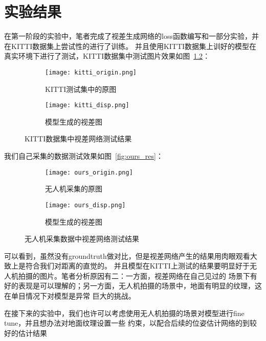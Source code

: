 \chapter{实验结果}
\label{cha:china}

在第一阶段的实验中，笔者完成了视差生成网络的loss函数编写和一部分实验，并在KITTI数据集上尝试性的进行了训练。
并且使用KITTI数据集上训好的模型在真实环境下进行了测试，KITTI数据集中测试图片效果如图~\ref{fig:kitti_res}：

\begin{figure}
\begin{subfigure}{1.\textwidth}
  \centering
  \texttt{[image: kitti\_origin.png]}
  \caption{KITTI测试集中的原图}
\end{subfigure}%

\begin{subfigure}{1.\textwidth}
  \centering
  \texttt{[image: kitti\_disp.png]}
  \caption{模型生成的视差图}
\end{subfigure}
\caption{KITTI数据集中视差网络测试结果}
\label{fig:kitti_res}
\end{figure}

我们自己采集的数据测试效果如图~\ref{fig:ours_res}：


\begin{figure}
\begin{subfigure}{.5\textwidth}
  \centering
  \texttt{[image: ours\_origin.png]}
  \caption{无人机采集的原图}
\end{subfigure}%
\begin{subfigure}{.5\textwidth}
  \centering
  \texttt{[image: ours\_disp.png]}
  \caption{模型生成的视差图}
\end{subfigure}
\caption{ 无人机采集数据中视差网络测试结果}
\label{fig:kitti_res}
\end{figure}

可以看到，虽然没有groundtruth做对比，但是视差网络产生的结果用肉眼观看大致上是符合我们对距离的直觉的。
并且模型在KITTI上测试的结果要明显好于无人机拍摄的图片。笔者分析原因有二：一方面，视差网络在自己见过的
场景下有好的表现是可以理解的；另一方面，无人机拍摄的场景中，地面有明显的纹理，这在单目情况下对模型是异常
巨大的挑战。

在接下来的实验中，我们也许可以考虑使用无人机拍摄的场景对模型进行fine tune，并且想办法对地面纹理设置一些
约束，以配合后续的位姿估计网络的到较好的估计结果
